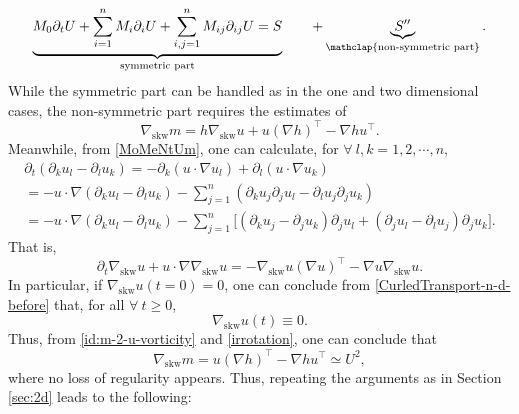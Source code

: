 \documentclass[reqno,11pt]{amsart}
\theoremstyle{plain}
\theoremstyle{definition}
\numberwithin{equation}{section}
\begin{document}
\begin{equation}
    \label{n-d-006}
    \underbrace{M_0 \partial_t U + \sum_{i=1}^n M_i \partial_i U + \sum_{i,j =1}^n M_{ij} \partial_{ij} U = S}_{\text{symmetric part}} \qquad  + \underbrace{S''}_{\mathclap{\text{non-symmetric part}}}. 
\end{equation}
While the symmetric part can be handled as in the one and two dimensional cases, the non-symmetric part requires the estimates of 
\begin{equation}
\label{id:m-2-u-vorticity}
    \nabla_\mathrm{skw} m = h {\nabla_\mathrm{skw} u} + u (\nabla h)^\top - \nabla h u^\top. 
\end{equation}
Meanwhile, from \eqref{MoMeNtUm}, one can calculate, for $ \forall \ l,k = 1,2,\cdots, n $, 
\begin{gather*}
    \partial_t (\partial_k u_l - \partial_l u_k) = - \partial_k (u\cdot \nabla u_l) + \partial_l (u\cdot \nabla u_k) \\ = - u \cdot \nabla (\partial_k u_l - \partial_l u_k) - \sum_{j=1}^n ( \partial_k u_j \partial_j u_l - \partial_l u_j \partial_j u_k) \\
    = - u \cdot \nabla (\partial_k u_l - \partial_l u_k) - \sum_{j=1}^n \lbrack  (\partial_k u_j - \partial_j u_k) \partial_j u_l + (\partial_j u_l - \partial_l u_j) \partial_j u_k \rbrack.
\end{gather*}
That is,
\begin{equation}
\label{CurledTransport-n-d-before}
    \partial_t \nabla_\mathrm{skw} u + u \cdot \nabla \nabla_\mathrm{skw} u= - \nabla_\mathrm{skw} u (\nabla u)^\top - \nabla u \nabla_\mathrm{skw} u.
\end{equation}
In particular, if $ \nabla_\mathrm{skw} u(t=0)=0 $, one can conclude from \eqref{CurledTransport-n-d-before} that, for all $ \forall \ t \geq 0 $,
\begin{equation}
    \label{irrotation}
    \nabla_\mathrm{skw} u(t) \equiv 0.
\end{equation}
Thus, from \eqref{id:m-2-u-vorticity} and \eqref{irrotation}, one can conclude that 
\begin{equation}
\label{est:skw-m}
    \nabla_\mathrm{skw}m = u (\nabla h)^\top - \nabla h u^\top \simeq U^2,
\end{equation}
where no loss of regularity appears. 
Thus, repeating the arguments as in Section \ref{sec:2d} leads to the following:
\end{document}
